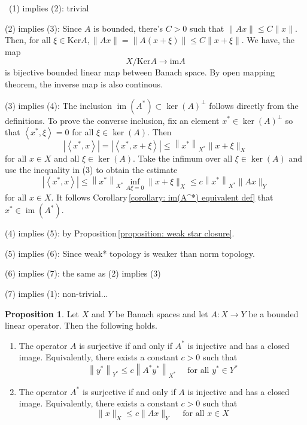 \documentclass[12pt,a4paper]{book}
\newenvironment{prooff}{{\noindent\it\textcolor{cyan!40!black}{Proof}:}\,}{\par}
\newcommand{\norm}[1]{\|{#1}\|}
\newenvironment{enu}{\begin{enumerate}[(1)]}{\end{enumerate}}
\theoremstyle{definition}
\newtheorem{prop}[defn]{Proposition}
\begin{document}
\begin{prooff}
    (1) implies (2): trivial 

    (2) implies (3): Since $A$ is bounded, there's $C>0$ such that $\norm{Ax}\le C\norm{x}$. 
    Then, for all $\xi\in \text{Ker}{A}, \norm{Ax}=\norm{A(x+\xi)}\le C\norm{x+\xi}$. We have, the map 
    \begin{equation*}
        X/\text{Ker}A \rightarrow \text{im}A
    \end{equation*}
    is bijective bounded linear map between Banach space. By open mapping theorem, 
    the inverse map is also continous. 

    (3) implies (4): 
    The inclusion $\operatorname{im}\left(A^*\right) \subset \operatorname{ker}(A)^{\perp}$ follows directly from the definitions. To prove the converse inclusion, fix an element $x^* \in \operatorname{ker}(A)^{\perp}$ so that $\left\langle x^*, \xi\right\rangle=0$ for all $\xi \in \operatorname{ker}(A)$. Then
$$
\left|\left\langle x^*, x\right\rangle\right|=\left|\left\langle x^*, x+\xi\right\rangle\right| \leq\left\|x^*\right\|_{X^*}\|x+\xi\|_X
$$
for all $x \in X$ and all $\xi \in \operatorname{ker}(A)$. Take the infimum over all $\xi \in \operatorname{ker}(A)$ and use the inequality in (3) to obtain the estimate
$$
\left|\left\langle x^*, x\right\rangle\right| \leq\left\|x^*\right\|_{X^*} \inf _{A \xi=0}\|x+\xi\|_X \leq c\left\|x^*\right\|_{X^*}\|A x\|_Y
$$
for all $x \in X$. It follows Corollary\,\ref{corollary: im(A^*) equivalent def} that $x^* \in \operatorname{im}\left(A^*\right)$.

    (4) implies (5): by Proposition\,\ref{proposition: weak star closure}. 

    (5) implies (6): Since weak* topology is weaker than norm topology. 

    (6) implies (7): the same as (2) implies (3) 

    (7) implies (1): non-trivial... 

\end{prooff}
\begin{prop}
    Let $X$ and $Y$ be Banach spaces and let $A: X \rightarrow Y$ be a bounded linear operator. Then the following holds.
    \begin{enu} 
    \item The operator $A$ is surjective if and only if $A^*$ is injective and has a closed image. Equivalently, there exists a constant $c>0$ such that
    $$
    \left\|y^*\right\|_{Y^*} \leq c\left\|A^* y^*\right\|_{X^*} \quad \text { for all } y^* \in Y^*
    $$
    \item The operator $A^*$ is surjective if and only if $A$ is injective and has a closed image. Equivalently, there exists a constant $c>0$ such that
    $$
    \|x\|_X \leq c\|A x\|_Y \quad \text { for all } x \in X
    $$
    \end{enu}


\end{prop}
\end{document}
